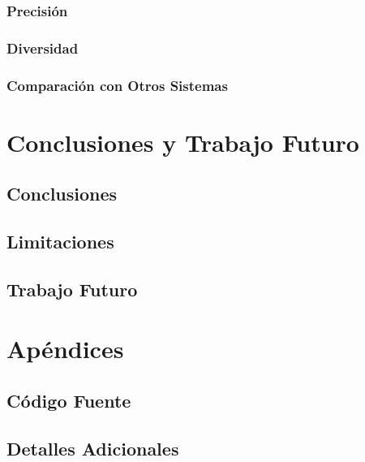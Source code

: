 \documentclass[a4paper,12pt]{report}
\begin{document}
        \subsection{Precisión}
        \subsection{Diversidad}
        \subsection{Comparación con Otros Sistemas}

\chapter{Conclusiones y Trabajo Futuro}
    \section{Conclusiones}
    \section{Limitaciones}
    \section{Trabajo Futuro}

\appendix
\chapter{Apéndices}
\section{Código Fuente}
\section{Detalles Adicionales}





\end{document}
